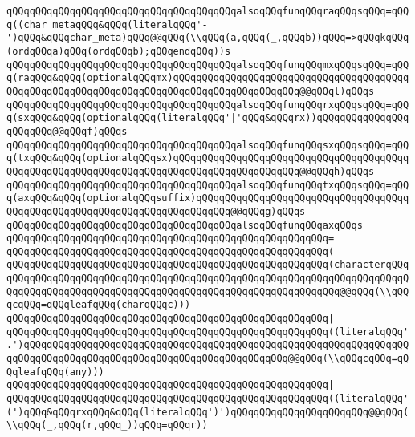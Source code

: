 \verb|qQQqqQQqqQQqqQQqqQQqqQQqqQQqqQQqqQQqqQQqalsoqQQqfunqQQqraqQQqsqQQq=qQQq((char_metaqQQq&qQQq(literalqQQq'-')qQQq&qQQqchar_meta)qQQq@@qQQq(\\qQQq(a,qQQq(_,qQQqb))qQQq=>qQQqkqQQq(ordqQQqa)qQQq(ordqQQqb);qQQqendqQQq))s|\newline
\verb|qQQqqQQqqQQqqQQqqQQqqQQqqQQqqQQqqQQqqQQqalsoqQQqfunqQQqmxqQQqsqQQq=qQQq(raqQQq&qQQq(optionalqQQqmx)qQQqqQQqqQQqqQQqqQQqqQQqqQQqqQQqqQQqqQQqqQQqqQQqqQQqqQQqqQQqqQQqqQQqqQQqqQQqqQQqqQQqqQQqqQQq@@qQQql)qQQqs|\newline
\verb|qQQqqQQqqQQqqQQqqQQqqQQqqQQqqQQqqQQqqQQqalsoqQQqfunqQQqrxqQQqsqQQq=qQQq(sxqQQq&qQQq(optionalqQQq(literalqQQq'|\verb#|'qQQq&qQQqrx))qQQqqQQqqQQqqQQqqQQqqQQq@@qQQqf)qQQqs#\newline
\verb|qQQqqQQqqQQqqQQqqQQqqQQqqQQqqQQqqQQqqQQqalsoqQQqfunqQQqsxqQQqsqQQq=qQQq(txqQQq&qQQq(optionalqQQqsx)qQQqqQQqqQQqqQQqqQQqqQQqqQQqqQQqqQQqqQQqqQQqqQQqqQQqqQQqqQQqqQQqqQQqqQQqqQQqqQQqqQQqqQQqqQQq@@qQQqh)qQQqs|\newline
\verb|qQQqqQQqqQQqqQQqqQQqqQQqqQQqqQQqqQQqqQQqalsoqQQqfunqQQqtxqQQqsqQQq=qQQq(axqQQq&qQQq(optionalqQQqsuffix)qQQqqQQqqQQqqQQqqQQqqQQqqQQqqQQqqQQqqQQqqQQqqQQqqQQqqQQqqQQqqQQqqQQqqQQqqQQq@@qQQqg)qQQqs|\newline
\verb|qQQqqQQqqQQqqQQqqQQqqQQqqQQqqQQqqQQqqQQqalsoqQQqfunqQQqaxqQQqs|\newline
\verb|qQQqqQQqqQQqqQQqqQQqqQQqqQQqqQQqqQQqqQQqqQQqqQQqqQQqqQQq=|\newline
\verb|qQQqqQQqqQQqqQQqqQQqqQQqqQQqqQQqqQQqqQQqqQQqqQQqqQQqqQQq(|\newline
\verb|qQQqqQQqqQQqqQQqqQQqqQQqqQQqqQQqqQQqqQQqqQQqqQQqqQQqqQQq(characterqQQqqQQqqQQqqQQqqQQqqQQqqQQqqQQqqQQqqQQqqQQqqQQqqQQqqQQqqQQqqQQqqQQqqQQqqQQqqQQqqQQqqQQqqQQqqQQqqQQqqQQqqQQqqQQqqQQqqQQqqQQqqQQqqQQq@@qQQq(\\qQQqcqQQq=qQQqleafqQQq(charqQQqc)))|\newline
\verb|qQQqqQQqqQQqqQQqqQQqqQQqqQQqqQQqqQQqqQQqqQQqqQQqqQQqqQQq|\verb#|#\newline
\verb|qQQqqQQqqQQqqQQqqQQqqQQqqQQqqQQqqQQqqQQqqQQqqQQqqQQqqQQq((literalqQQq'.')qQQqqQQqqQQqqQQqqQQqqQQqqQQqqQQqqQQqqQQqqQQqqQQqqQQqqQQqqQQqqQQqqQQqqQQqqQQqqQQqqQQqqQQqqQQqqQQqqQQqqQQqqQQqqQQqqQQq@@qQQq(\\qQQqcqQQq=qQQqleafqQQq(any)))|\newline
\verb|qQQqqQQqqQQqqQQqqQQqqQQqqQQqqQQqqQQqqQQqqQQqqQQqqQQqqQQq|\verb#|#\newline
\verb|qQQqqQQqqQQqqQQqqQQqqQQqqQQqqQQqqQQqqQQqqQQqqQQqqQQqqQQq((literalqQQq'(')qQQq&qQQqrxqQQq&qQQq(literalqQQq')')qQQqqQQqqQQqqQQqqQQqqQQq@@qQQq(\\qQQq(_,qQQq(r,qQQq_))qQQq=qQQqr))|\newline
